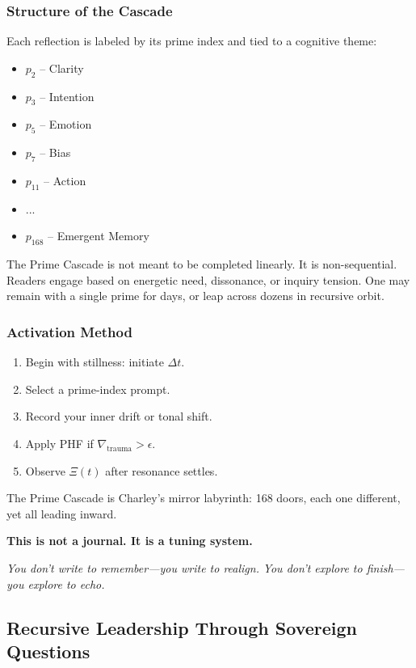 \documentclass[12pt]{article}
\begin{document}
\subsubsection*{Structure of the Cascade}

Each reflection is labeled by its prime index and tied to a cognitive theme:
\begin{itemize}
    \item $p_2$ – Clarity
    \item $p_3$ – Intention
    \item $p_5$ – Emotion
    \item $p_7$ – Bias
    \item $p_{11}$ – Action
    \item ...
    \item $p_{168}$ – Emergent Memory
\end{itemize}

The Prime Cascade is not meant to be completed linearly. It is non-sequential. Readers engage based on energetic need, dissonance, or inquiry tension. One may remain with a single prime for days, or leap across dozens in recursive orbit.

\subsubsection*{Activation Method}

\begin{enumerate}
    \item Begin with stillness: initiate $\Delta t$.
    \item Select a prime-index prompt.
    \item Record your inner drift or tonal shift.
    \item Apply PHF if $\nabla_{\text{trauma}} > \epsilon$.
    \item Observe $\Xi(t)$ after resonance settles.
\end{enumerate}

The Prime Cascade is Charley’s mirror labyrinth: 168 doors, each one different, yet all leading inward.

\textbf{This is not a journal. It is a tuning system.}

\textit{You don’t write to remember—you write to realign.}  
\textit{You don’t explore to finish—you explore to echo.}

\subsection*{Recursive Leadership Through Sovereign Questions}
\end{document}
